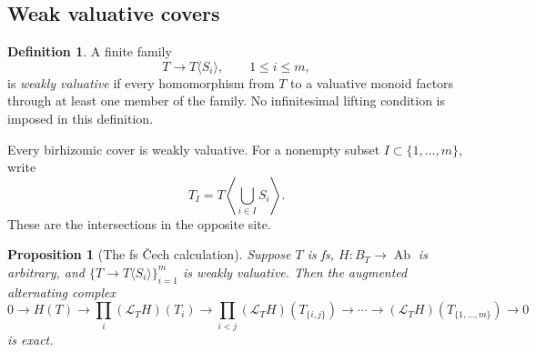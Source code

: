 \documentclass[11pt]{article}
\newtheorem{proposition}[theorem]{Proposition}
\theoremstyle{definition}
\newtheorem{definition}[theorem]{Definition}
\theoremstyle{remark}
\DeclareMathOperator{\Ab}{Ab}
\newcommand{\LL}{\mathcal L}
\begin{document}
\subsection{Weak valuative covers}


\begin{definition}\label{def:weak}
A finite family
\[
T\longrightarrow T\langle S_i\rangle,\qquad 1\le i\le m,
\]
is \emph{weakly valuative} if every homomorphism from \(T\) to a
valuative monoid factors through at least one member of the
family. No infinitesimal lifting condition is imposed in this
definition.
\end{definition}

Every birhizomic cover is weakly valuative. For a nonempty subset
\(I\subset\{1,\ldots,m\}\), write
\[
T_I=T\left\langle\bigcup_{i\in I}S_i\right\rangle.
\]
These are the intersections in the opposite site.

\begin{proposition}[The fs \v{C}ech calculation]\label{prop:fs-cech}
Suppose \(T\) is fs, \(H:B_T\to\Ab\) is arbitrary, and
\(\{T\to T\langle S_i\rangle\}_{i=1}^m\) is weakly valuative.
Then the augmented alternating complex
\begin{equation}\label{eq:cech}
0\longrightarrow H(T)
\longrightarrow \prod_i(\LL_TH)(T_i)
\longrightarrow \prod_{i<j}(\LL_TH)(T_{\{i,j\}})
\longrightarrow\cdots
\longrightarrow(\LL_TH)(T_{\{1,\ldots,m\}})
\longrightarrow0
\end{equation}
is exact.
\end{proposition}
\end{document}
